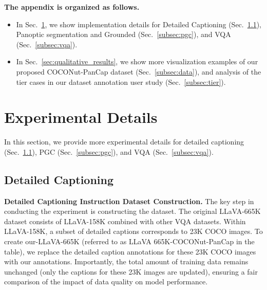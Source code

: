 \clearpage


\appendix

\noindent \textbf{The appendix is organized as follows.}
\begin{itemize}
    \item In Sec.~\ref{sec:experimental_details}, we show implementation details for Detailed Captioning (Sec.~\ref{subsec:detailed_captioning}), Panoptic segmentation and Grounded (Sec.~\ref{subsec:pgc}), and VQA (Sec.~\ref{subsec:vqa}).
    \item In Sec.~\ref{sec:qualitative_results}, we show more visualization examples of our proposed COCONut-PanCap dataset (Sec.~\ref{subsec:data}), and analysis of the tier cases in our dataset annotation user study (Sec.~\ref{subsec:tier}).
\end{itemize}










\section{Experimental Details}
\label{sec:experimental_details}
In this section, we provide more experimental details for detailed captioning (Sec.~\ref{subsec:detailed_captioning}), PGC (Sec.~\ref{subsec:pgc}), and VQA (Sec.~\ref{subsec:vqa}).

\subsection{Detailed Captioning}
\label{subsec:detailed_captioning}




\noindent\textbf{Detailed Captioning Instruction Dataset Construction.}
The key step in conducting the experiment is constructing the dataset. The original LLaVA-665K dataset consists of LLaVA-158K combined with other VQA datasets. Within LLaVA-158K, a subset of detailed captions corresponds to 23K COCO images. To create our-LLaVA-665K (referred to as LLaVA 665K-COCONut-PanCap in the table), we replace the detailed caption annotations for these 23K COCO images with our annotations. Importantly, the total amount of training data remains unchanged (only the captions for these 23K images are updated), ensuring a fair comparison of the impact of data quality on model performance.






